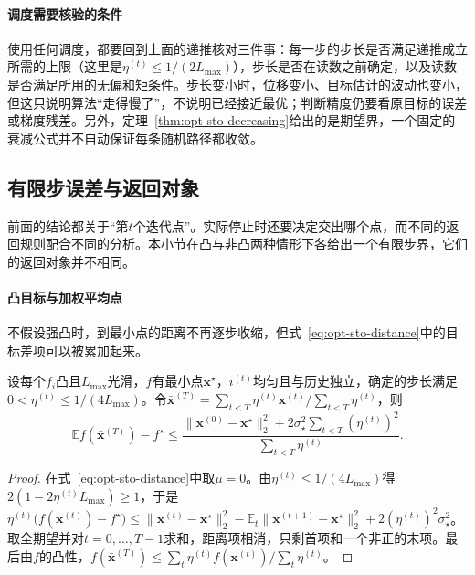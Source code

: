 \paragraph{调度需要核验的条件}
使用任何调度，都要回到上面的递推核对三件事：每一步的步长是否满足递推成立所需的上限（这里是$\eta^{(t)}\leq1/(2L_{\max})$），步长是否在读数之前确定，以及读数是否满足所用的无偏和矩条件。步长变小时，位移变小、目标估计的波动也变小，但这只说明算法“走得慢了”，不说明已经接近最优；判断精度仍要看原目标的误差或梯度残差。另外，定理~\ref{thm:opt-sto-decreasing}给出的是期望界，一个固定的衰减公式并不自动保证每条随机路径都收敛。

\subsection{有限步误差与返回对象}
\label{sec:opt-sto-return}

前面的结论都关于“第$t$个迭代点”。实际停止时还要决定交出哪个点，而不同的返回规则配合不同的分析。本小节在凸与非凸两种情形下各给出一个有限步界，它们的返回对象并不相同。

\paragraph{凸目标与加权平均点}
不假设强凸时，到最小点的距离不再逐步收缩，但式~\eqref{eq:opt-sto-distance}中的目标差项可以被累加起来。

\begin{theorem}[凸目标的加权平均点]
\label{thm:opt-sto-convex-average}
设每个$f_i$凸且$L_{\max}$光滑，$f$有最小点$\bm x^\star$，$i^{(t)}$均匀且与历史独立，确定的步长满足$0<\eta^{(t)}\leq1/(4L_{\max})$。令$\bar{\bm x}^{(T)}=\sum_{t<T}\eta^{(t)}\bm x^{(t)}\big/\sum_{t<T}\eta^{(t)}$，则
\begin{equation}
\label{eq:opt-sto-convex-average}
  \mathbb E f(\bar{\bm x}^{(T)})-f^\star\leq\frac{\lVert\bm x^{(0)}-\bm x^\star\rVert_2^2+2\sigma_\star^2\sum_{t<T}(\eta^{(t)})^2}{\sum_{t<T}\eta^{(t)}} .
\end{equation}
\end{theorem}

\begin{proof}
在式~\eqref{eq:opt-sto-distance}中取$\mu=0$。由$\eta^{(t)}\leq1/(4L_{\max})$得$2(1-2\eta^{(t)}L_{\max})\geq1$，于是
$\eta^{(t)}\bigl(f(\bm x^{(t)})-f^\star\bigr)\leq\lVert\bm x^{(t)}-\bm x^\star\rVert_2^2-\mathbb E_t\lVert\bm x^{(t+1)}-\bm x^\star\rVert_2^2+2(\eta^{(t)})^2\sigma_\star^2$。取全期望并对$t=0,\dots,T-1$求和，距离项相消，只剩首项和一个非正的末项。最后由$f$的凸性，$f(\bar{\bm x}^{(T)})\leq\sum_t\eta^{(t)}f(\bm x^{(t)})/\sum_t\eta^{(t)}$。
\end{proof}

